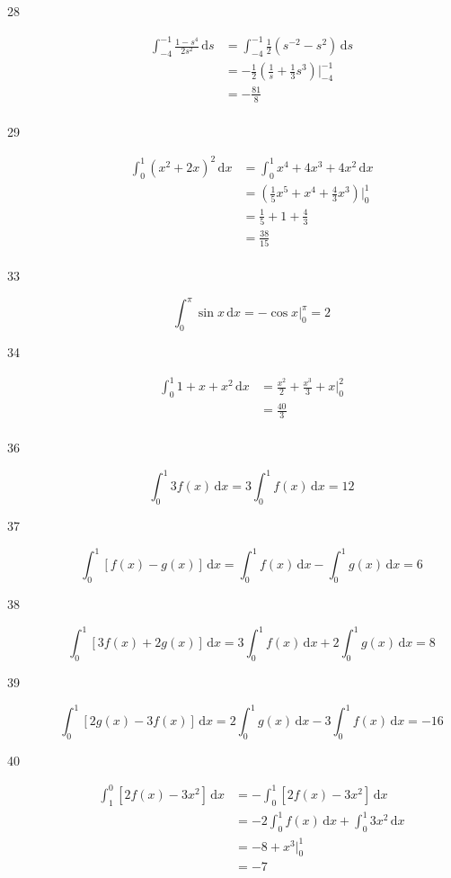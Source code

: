 \documentclass{exam}
\begin{document}
\begin{description}
\item[28]
\begin{align*}
  \int_{-4}^{-1} \frac{1 - s^4}{2s^2} \, \mathrm{d}s &= \int_{-4}^{-1} \frac{1}{2} (s^{-2} - s^2) \, \mathrm{d}s \\
  &= - \frac{1}{2} \left( \frac{1}{s} + \frac{1}{3} s^3 \right) \bigg|_{-4}^{-1} \\
  &= - \frac{81}{8} \\
\end{align*}

\item[29]
\begin{align*}
  \int_0^1 (x^2 + 2x)^2 \, \mathrm{d}x &= \int_0^1 x^4 + 4x^3 + 4x^2 \, \mathrm{d}x \\
  &= \left( \frac{1}{5} x^5 + x^4 + \frac{4}{3} x^3 \right) \bigg|_0^1 \\
  &= \frac{1}{5} + 1 + \frac{4}{3} \\
  &= \frac{38}{15} \\
\end{align*}

\item[33]
\[
  \int_0^\pi \sin x \, \mathrm{d}x = - \cos x \bigg|_0^\pi = 2
\]

\item[34]
\begin{align*}
  \int_0^1 1 + x + x^2 \, \mathrm{d}x &= \frac{x^2}{2} + \frac{x^3}{3} + x \bigg|_0^2 \\
  &= \frac{40}{3} \\
\end{align*}

\item[36]
\[
  \int_0^1 3 f(x) \, \mathrm{d}x = 3 \int_0^1 f(x) \, \mathrm{d}x = 12
\]

\item[37]
\[
  \int_0^1 [f(x) - g(x) ] \, \mathrm{d}x = \int_0^1 f(x) \, \mathrm{d}x - \int_0^1 g(x) \, \mathrm{d}x = 6
\]

\item[38]
\[
  \int_0^1 [3f(x) + 2 g(x) ] \, \mathrm{d}x = 3 \int_0^1 f(x) \, \mathrm{d}x + 2 \int_0^1 g(x) \, \mathrm{d}x = 8
\]

\item[39]
\[
  \int_0^1 [2g(x) - 3 f(x) ] \, \mathrm{d}x = 2 \int_0^1 g(x) \, \mathrm{d}x - 3 \int_0^1 f(x) \, \mathrm{d}x = -16
\]

\item[40]

\begin{align*}
  \int_1^0 [2f(x) - 3x^2 ] \, \mathrm{d}x &= - \int_0^1 [2f(x) - 3x^2 ] \, \mathrm{d}x \\
  &= - 2 \int_0^1 f(x) \, \mathrm{d}x + \int_0^1 3x^2 \, \mathrm{d}x \\
  &= -8 + x^3 \bigg|_0^1 \\
  &= -7 \\
\end{align*}

  
\end{description}
\end{document}
